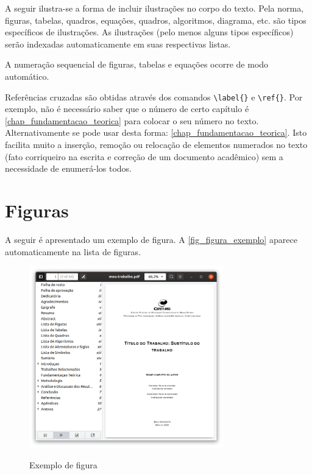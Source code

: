 \begin{apendicesenv}
    A seguir ilustra-se a forma de incluir ilustrações no corpo do texto.
    Pela norma, figuras, tabelas, quadros, equações, quadros, algoritmos, diagrama, etc.
    são tipos específicos de ilustrações.
    As ilustrações (pelo menos alguns tipos específicos) serão indexadas automaticamente em suas respectivas listas.

    A numeração sequencial de figuras, tabelas e equações ocorre de modo automático.

    Referências cruzadas são obtidas através dos comandos \verb|\label{}| e \verb|\ref{}|.
    Por exemplo, não é necessário saber que o número de certo capítulo é \ref{chap_fundamentacao_teorica} para colocar o seu número no texto.
    Alternativamente se pode usar desta forma: \autoref{chap_fundamentacao_teorica}.
    Isto facilita muito a inserção, remoção ou relocação de elementos numerados no texto (fato corriqueiro na escrita e correção de um documento acadêmico) sem a necessidade de enumerá-los todos.

    \section{Figuras}
    \label{sec_figuras}

    A seguir é apresentado um exemplo de figura.
    A \autoref{fig_figura_exemplo} aparece automaticamente na lista de figuras.

    \begin{figure}[!htb]
        \centering
        \caption{Exemplo de figura}
        \includegraphics[width=0.75\textwidth]{figuras/figura-exemplo}
        \label{fig_figura_exemplo}
    \end{figure}


\end{apendicesenv}
